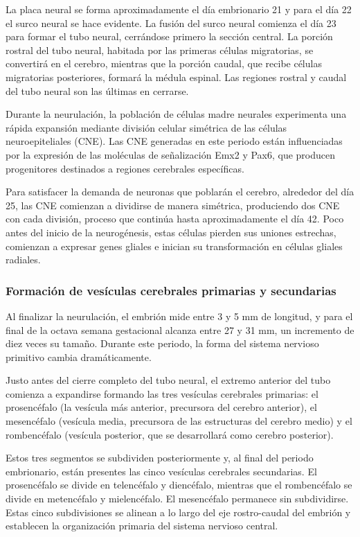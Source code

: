 \documentclass[11pt,letterpaper]{report}
\begin{document}
La placa neural se forma aproximadamente el día embrionario 21 y para el día 22
el surco neural se hace evidente. La fusión del surco neural comienza el día 23
para formar el tubo neural, cerrándose primero la sección central. La porción
rostral del tubo neural, habitada por las primeras células migratorias, se
convertirá en el cerebro, mientras que la porción caudal, que recibe células
migratorias posteriores, formará la médula espinal. Las regiones rostral y
caudal del tubo neural son las últimas en cerrarse. \cite{Gibb2018}

Durante la neurulación, la población de células madre neurales experimenta una
rápida expansión mediante división celular simétrica de las células
neuroepiteliales (CNE). Las CNE generadas en este periodo están influenciadas
por la expresión de las moléculas de señalización Emx2 y Pax6, que producen
progenitores destinados a regiones cerebrales específicas. \cite{Gibb2018}

Para satisfacer la demanda de neuronas que poblarán el cerebro, alrededor del
día 25, las CNE comienzan a dividirse de manera simétrica, produciendo dos
CNE con cada división, proceso que continúa hasta aproximadamente el día 42.
Poco antes del inicio de la neurogénesis, estas células pierden sus uniones
estrechas, comienzan a expresar genes gliales e inician su transformación en
células gliales radiales. \cite{Stiles2010}

\subsubsection{Formación de vesículas cerebrales primarias y secundarias}
Al finalizar la neurulación, el embrión mide entre 3 y 5 mm de longitud, y para
el final de la octava semana gestacional alcanza entre 27 y 31 mm, un
incremento de diez veces su tamaño. Durante este periodo, la forma del sistema
nervioso primitivo cambia dramáticamente. \cite{Stiles2010}

Justo antes del cierre completo del tubo neural, el extremo anterior del tubo
comienza a expandirse formando las tres vesículas cerebrales primarias: el
prosencéfalo (la vesícula más anterior, precursora del cerebro anterior), el
mesencéfalo (vesícula media, precursora de las estructuras del cerebro medio) y
el rombencéfalo (vesícula posterior, que se desarrollará como cerebro
posterior). \cite{Stiles2010}

Estos tres segmentos se subdividen posteriormente y, al final del periodo
embrionario, están presentes las cinco vesículas cerebrales secundarias. El
prosencéfalo se divide en telencéfalo y diencéfalo, mientras que el
rombencéfalo se divide en metencéfalo y mielencéfalo. El mesencéfalo permanece
sin subdividirse. Estas cinco subdivisiones se alinean a lo largo del eje
rostro-caudal del embrión y establecen la organización primaria del sistema
nervioso central. \cite{Stiles2010}
\end{document}
